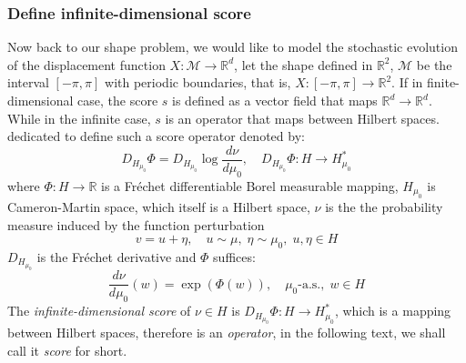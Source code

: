 \documentclass{article}
\begin{document}
\subsubsection{Define infinite-dimensional score}
Now back to our shape problem, we would like to model the stochastic evolution of the displacement function $X: \mathcal{M}\to\mathbb{R}^d$, let the shape defined in $\mathbb{R}^2$, $\mathcal{M}$ be the interval $[-\pi, \pi]$ with periodic boundaries, that is, $X:[-\pi, \pi]\to\mathbb{R}^2$. If in finite-dimensional case, the score $s$ is defined as a vector field that maps $\mathbb{R}^d\to\mathbb{R}^d$. While in the infinite case, $s$ is an operator that maps between Hilbert spaces. \cite{lim2023scorebased} dedicated to define such a score operator denoted by:
\begin{equation}
    D_{H_{\mu_0}}\Phi = D_{H_{\mu_0}}\log\frac{d \nu}{d\mu_0},\quad D_{H_{\mu_0}}\Phi: H\to H^*_{\mu_0}
\end{equation}
where $\Phi:H\to\mathbb{R}$ is a Fréchet differentiable Borel measurable mapping, $H_{\mu_0}$ is Cameron-Martin space, which itself is a Hilbert space, $\nu$ is the the probability measure induced by the function perturbation 
\begin{equation} \label{eq: data perturb}
    v = u + \eta, \quad u\sim \mu, \;\eta\sim \mu_0,\; u,\eta\in H
\end{equation}
$D_{H_{\mu_0}}$ is the Fréchet derivative and $\Phi$ suffices:
\begin{equation}
    \frac{d\nu}{d\mu_0}(w) = \exp(\Phi(w)),\quad \mu_0\text{-a.s.},\; w\in H
\end{equation}
The \emph{infinite-dimensional score} of $\nu\in H$ is $D_{H_{\mu_0}}\Phi: H\to H^*_{\mu_0}$, which is a mapping between Hilbert spaces, therefore is an \emph{operator}, in the following text, we shall call it \emph{score} for short. 
\end{document}
